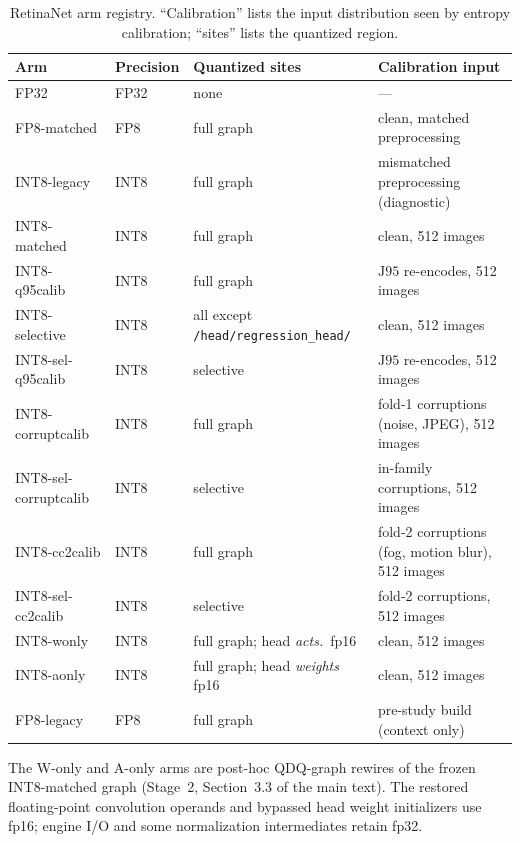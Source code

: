 \documentclass[10pt]{article}
\newcommand{\Jclean}{\mathrm{J95}}
\begin{document}
\begin{table}[h]
\centering\small
\caption{RetinaNet arm registry. ``Calibration'' lists the input distribution
seen by entropy calibration; ``sites'' lists the quantized region.}
\label{tab:registry-retinanet}
\begin{tabular}{@{}llll@{}}
\toprule
Arm & Precision & Quantized sites & Calibration input \\
\midrule
FP32 & FP32 & none & --- \\
FP8-matched & FP8 & full graph & clean, matched preprocessing \\
INT8-legacy & INT8 & full graph & mismatched preprocessing (diagnostic) \\
INT8-matched & INT8 & full graph & clean, 512 images \\
INT8-q95calib & INT8 & full graph & $\Jclean$ re-encodes, 512 images \\
INT8-selective & INT8 & all except \texttt{/head/regression\_head/} & clean, 512 images \\
INT8-sel-q95calib & INT8 & selective & $\Jclean$ re-encodes, 512 images \\
INT8-corruptcalib & INT8 & full graph & fold-1 corruptions (noise, JPEG), 512 images \\
INT8-sel-corruptcalib & INT8 & selective & in-family corruptions, 512 images \\
INT8-cc2calib & INT8 & full graph & fold-2 corruptions (fog, motion blur), 512 images \\
INT8-sel-cc2calib & INT8 & selective & fold-2 corruptions, 512 images \\
INT8-wonly & INT8 & full graph; head \emph{acts.}\ fp16 & clean, 512 images \\
INT8-aonly & INT8 & full graph; head \emph{weights} fp16 & clean, 512 images \\
\midrule
FP8-legacy & FP8 & full graph & pre-study build (context only) \\
\bottomrule
\end{tabular}
\end{table}

The W-only and A-only arms are post-hoc QDQ-graph rewires of the frozen
INT8-matched graph (Stage~2, Section~3.3 of the main text). The restored floating-point
convolution operands and bypassed head weight initializers use fp16; engine I/O
and some normalization intermediates retain fp32.
\end{document}
